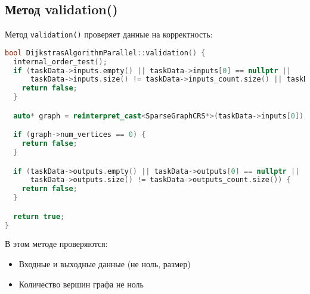 \documentclass[12pt]{article}
\begin{document}
\subsection{Метод validation()}
Метод \texttt{validation()} проверяет данные на корректность:
\begin{lstlisting}[language=c++, caption={Сам метод}]
bool DijkstrasAlgorithmParallel::validation() {
  internal_order_test();
  if (taskData->inputs.empty() || taskData->inputs[0] == nullptr ||
      taskData->inputs.size() != taskData->inputs_count.size() || taskData->inputs_count[0] != sizeof(SparseGraphCRS)) {
    return false;
  }

  auto* graph = reinterpret_cast<SparseGraphCRS*>(taskData->inputs[0]);

  if (graph->num_vertices == 0) {
    return false;
  }

  if (taskData->outputs.empty() || taskData->outputs[0] == nullptr ||
      taskData->outputs.size() != taskData->outputs_count.size()) {
    return false;
  }

  return true;
}
\end{lstlisting}
В этом методе проверяются:\\
\begin{itemize}
    \item Входные и выходные данные (не ноль, размер)
    \item Количество вершин графа не ноль
\end{itemize}
\end{document}
